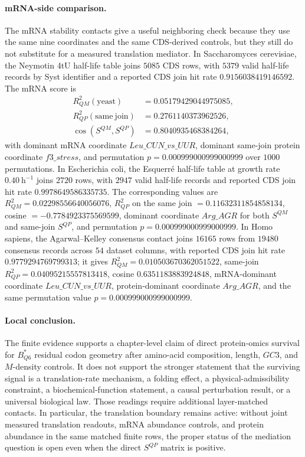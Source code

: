 \paragraph{mRNA-side comparison.}
The mRNA stability contacts give a useful neighboring check because they use the same nine coordinates and the same CDS-derived controls, but they still do not substitute for a measured translation mediator.  In Saccharomyces cerevisiae, the Neymotin 4tU half-life table joins $5085$ CDS rows, with $5379$ valid half-life records by Syst identifier and a reported CDS join hit rate $0.9156038419146592$.  The mRNA score is
$$
\begin{aligned}
R^2_{QM}(\mathrm{yeast}) &= 0.05179429044975085,\\
R^2_{QP}(\mathrm{same\ join}) &= 0.2761140373962526,\\
\cos(S^{QM},S^{QP}) &= 0.8040935468384264,
\end{aligned}
$$
with dominant mRNA coordinate $Leu\_CUN\_vs\_UUR$, dominant same-join protein coordinate $f3\_stress$, and permutation $p=0.000999000999000999$ over $1000$ permutations.  In Escherichia coli, the Esquerré half-life table at growth rate $0.40\ \mathrm{h}^{-1}$ joins $2720$ rows, with $2947$ valid half-life records and reported CDS join hit rate $0.9978649586335735$.  The corresponding values are $R^2_{QM}=0.02298556640056076$, $R^2_{QP}$ on the same join $=0.11632311854858134$, cosine $=-0.7784923375569599$, dominant coordinate $Arg\_AGR$ for both $S^{QM}$ and same-join $S^{QP}$, and permutation $p=0.000999000999000999$.  In Homo sapiens, the Agarwal--Kelley consensus contact joins $16165$ rows from $19480$ consensus records across $54$ dataset columns, with reported CDS join hit rate $0.9779294769799313$; it gives $R^2_{QM}=0.010503670362051522$, same-join $R^2_{QP}=0.04095215557813418$, cosine $0.6351183883924848$, mRNA-dominant coordinate $Leu\_CUN\_vs\_UUR$, protein-dominant coordinate $Arg\_AGR$, and the same permutation value $p=0.000999000999000999$.

\paragraph{Local conclusion.}
The finite evidence supports a chapter-level claim of direct protein-omics survival for $B^*_{Q6}$ residual codon geometry after amino-acid composition, length, $GC3$, and $M$-density controls.  It does not support the stronger statement that the surviving signal is a translation-rate mechanism, a folding effect, a physical-admissibility constraint, a biochemical-function statement, a causal perturbation result, or a universal biological law.  Those readings require additional layer-matched contacts.  In particular, the translation boundary remains active: without joint measured translation readouts, mRNA abundance controls, and protein abundance in the same matched finite rows, the proper status of the mediation question is open even when the direct $S^{QP}$ matrix is positive.
